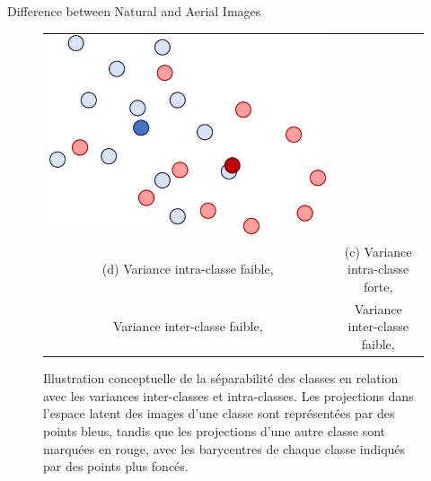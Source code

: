 \begin{subsectionframemod}{Difference between Natural and Aerial Images}
\begin{figure}[!h]
\begin{tabular}{cc}
        \includegraphics[scale=0.25]{Figures/ncon_nsep}\\
        (d) Variance intra-classe faible, & (c) Variance intra-classe forte, \\
        Variance inter-classe faible,  & Variance inter-classe faible, \\
    \end{tabular}
    \caption{Illustration conceptuelle de la séparabilité des classes en relation avec les variances inter-classes et intra-classes. Les projections dans l'espace latent des images d'une classe sont représentées par des points bleus, tandis que les projections d'une autre classe sont marquées en rouge, avec les barycentres de chaque classe indiqués par des points plus foncés.}
    \label{fig:sep_classes}
\end{figure}
\end{subsectionframemod}



